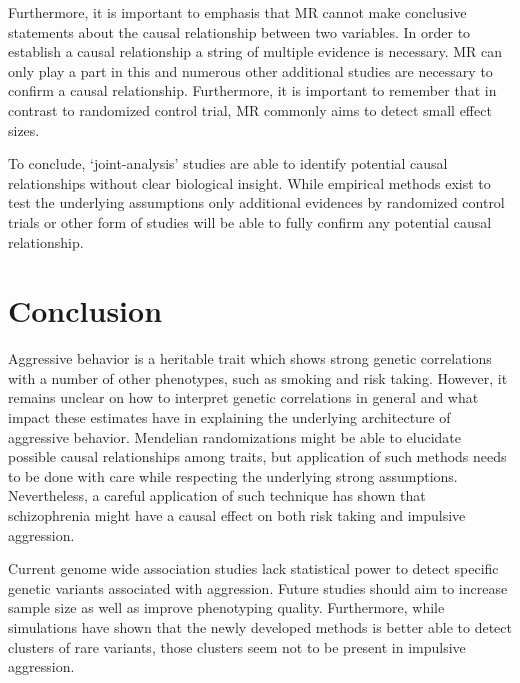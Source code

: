 Furthermore, it is important to emphasis that MR cannot make conclusive statements about the causal relationship between two variables.
In order to establish a causal relationship a string of multiple evidence is necessary.
MR can only play a part in this and numerous other additional studies are necessary to confirm a causal relationship.
Furthermore, it is important to remember that in contrast to randomized control trial, MR commonly aims to detect small effect sizes.

To conclude, `joint-analysis' studies are able to identify potential causal relationships without clear biological insight.
While empirical methods exist to test the underlying assumptions only additional evidences by randomized control trials or other form of studies will be able to fully confirm any potential causal relationship.

\section{Conclusion}
\label{sec:conclusion}

Aggressive behavior is a heritable trait which shows strong genetic correlations with a number of other phenotypes, such as smoking and risk taking.
However, it remains unclear on how to interpret genetic correlations in general and what impact these estimates have in explaining the underlying architecture of aggressive behavior.
Mendelian randomizations might be able to elucidate possible causal relationships among traits, but application of such methods needs to be done with care while respecting the underlying strong assumptions. 
Nevertheless, a careful application of such technique has shown that schizophrenia might have a causal effect on both risk taking and impulsive aggression.

Current genome wide association studies lack statistical power to detect specific genetic variants associated with aggression.
Future studies should aim to increase sample size as well as improve phenotyping quality.
Furthermore, while simulations have shown that the newly developed methods is better able to detect clusters of rare variants, those clusters seem not to be present in impulsive aggression.
